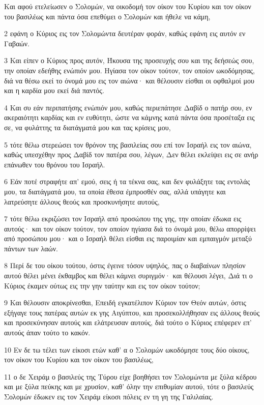 \par Και αφού ετελείωσεν ο Σολομών, να οικοδομή τον οίκον του Κυρίου και τον οίκον του βασιλέως και πάντα όσα επεθύμει ο Σολομών και ήθελε να κάμη,
\par 2 εφάνη ο Κύριος εις τον Σολομώντα δευτέραν φοράν, καθώς εφάνη εις αυτόν εν Γαβαών.
\par 3 Και είπεν ο Κύριος προς αυτόν, Ήκουσα της προσευχής σου και της δεήσεώς σου, την οποίαν εδεήθης ενώπιόν μου. Ηγίασα τον οίκον τούτον, τον οποίον ωκοδόμησας, διά να θέσω εκεί το όνομά μου εις τον αιώνα· και θέλουσιν είσθαι οι οφθαλμοί μου και η καρδία μου εκεί διά παντός.
\par 4 Και συ εάν περιπατήσης ενώπιόν μου, καθώς περιεπάτησε Δαβίδ ο πατήρ σου, εν ακεραιότητι καρδίας και εν ευθύτητι, ώστε να κάμνης κατά πάντα όσα προσέταξα εις σε, να φυλάττης τα διατάγματά μου και τας κρίσεις μου,
\par 5 τότε θέλω στερεώσει τον θρόνον της βασιλείας σου επί τον Ισραήλ εις τον αιώνα, καθώς υπεσχέθην προς Δαβίδ τον πατέρα σου, λέγων, Δεν θέλει εκλείψει εις σε ανήρ επάνωθεν του θρόνου του Ισραήλ.
\par 6 Εάν ποτέ στραφήτε απ' εμού, σεις ή τα τέκνα σας, και δεν φυλάξητε τας εντολάς μου, τα διατάγματά μου, τα οποία έθεσα έμπροσθέν σας, αλλά υπάγητε και λατρεύσητε άλλους θεούς και προσκυνήσητε αυτούς,
\par 7 τότε θέλω εκριζώσει τον Ισραήλ από προσώπου της γης, την οποίαν έδωκα εις αυτούς· και τον οίκον τούτον, τον οποίον ηγίασα διά το όνομά μου, θέλω απορρίψει από προσώπου μου· και ο Ισραήλ θέλει είσθαι εις παροιμίαν και εμπαιγμόν μεταξύ πάντων των λαών.
\par 8 Περί δε του οίκου τούτου, όστις έγεινε τόσον υψηλός, πας ο διαβαίνων πλησίον αυτού θέλει μένει έκθαμβος και θέλει κάμνει συριγμόν· και θέλουσι λέγει, Διά τι ο Κύριος έκαμεν ούτως εις την γην ταύτην και εις τον οίκον τούτον;
\par 9 Και θέλουσιν αποκρίνεσθαι, Επειδή εγκατέλιπον Κύριον τον Θεόν αυτών, όστις εξήγαγε τους πατέρας αυτών εκ γης Αιγύπτου, και προσεκολλήθησαν εις άλλους θεούς και προσεκύνησαν αυτούς και ελάτρευσαν αυτούς, διά τούτο ο Κύριος επέφερεν επ' αυτούς άπαν τούτο το κακόν.
\par 10 Εν δε τω τέλει των είκοσι ετών καθ' α ο Σολομών ωκοδόμησε τους δύο οίκους, τον οίκον του Κυρίου και τον οίκον του βασιλέως,
\par 11 ο δε Χειράμ ο βασιλεύς της Τύρου είχε βοηθήσει τον Σολομώντα με ξύλα κέδρου και με ξύλα πεύκης και με χρυσίον, καθ' όλην την επιθυμίαν αυτού, τότε ο βασιλεύς Σολομών έδωκεν εις τον Χειράμ είκοσι πόλεις εν τη γη της Γαλιλαίας.
